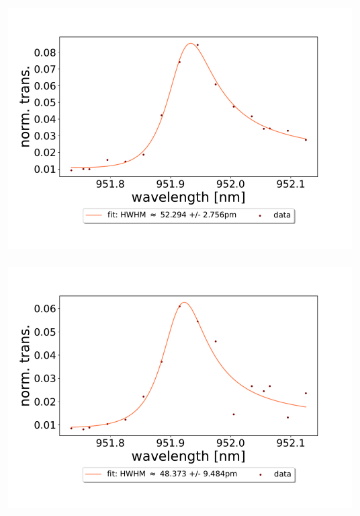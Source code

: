 \begin{figure}[h!]
    \centering
    \begin{subfigure}[b]{0.49\textwidth}
        \includegraphics[width=\textwidth]{figures/results/double fano fits/20250326/323um_M3:M5_fit_1.pdf}
        \caption{}
        \label{fig:323um_M3:M5_fit_1}
    \end{subfigure}
    \begin{subfigure}[b]{0.49\textwidth}
        \includegraphics[width=\textwidth]{figures/results/double fano fits/20250326/323um_M3:M5_fit_2.pdf}
        \caption{}
        \label{fig:323um_M3:M5_fit_2}
    \end{subfigure}
    \begin{subfigure}[b]{0.49\textwidth}

\end{subfigure}
\end{figure}
